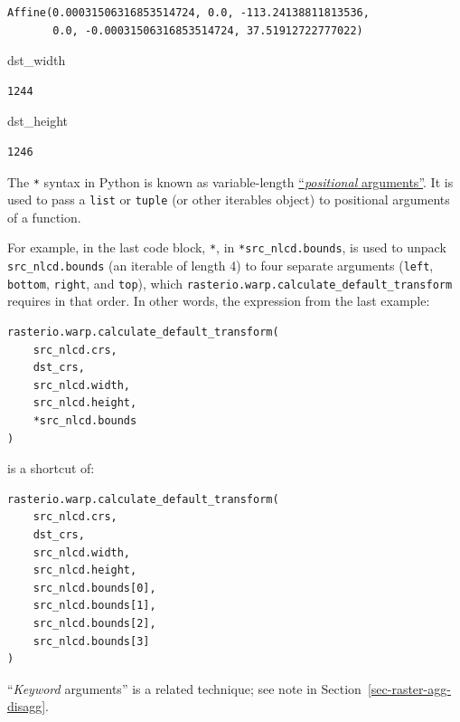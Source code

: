 \documentclass[
  letterpaper,
]{krantz}
\newenvironment{Shaded}{\begin{snugshade}}{\end{snugshade}}
\newcommand{\NormalTok}[1]{\textcolor[rgb]{0.00,0.23,0.31}{#1}}
\begin{document}
\begin{verbatim}
Affine(0.00031506316853514724, 0.0, -113.24138811813536,
       0.0, -0.00031506316853514724, 37.51912722777022)
\end{verbatim}

\begin{Shaded}
\begin{Highlighting}[]
\NormalTok{dst\_width}
\end{Highlighting}
\end{Shaded}

\begin{verbatim}
1244
\end{verbatim}

\begin{Shaded}
\begin{Highlighting}[]
\NormalTok{dst\_height}
\end{Highlighting}
\end{Shaded}

\begin{verbatim}
1246
\end{verbatim}

\begin{tcolorbox}[enhanced jigsaw, title=\textcolor{quarto-callout-note-color}{\faInfo}\hspace{0.5em}{Note}, coltitle=black, colbacktitle=quarto-callout-note-color!10!white, breakable, titlerule=0mm, colframe=quarto-callout-note-color-frame, opacitybacktitle=0.6, colback=white, bottomrule=.15mm, left=2mm, leftrule=.75mm, toprule=.15mm, toptitle=1mm, bottomtitle=1mm, arc=.35mm, opacityback=0, rightrule=.15mm]

The \texttt{*} syntax in Python is known as variable-length
\href{https://docs.python.org/3/glossary.html\#term-argument}{``\emph{positional}
arguments''}. It is used to pass a \texttt{list} or \texttt{tuple} (or
other iterables object) to positional arguments of a function.

For example, in the last code block, \texttt{*}, in
\texttt{*src\_nlcd.bounds}, is used to unpack \texttt{src\_nlcd.bounds}
(an iterable of length 4) to four separate arguments (\texttt{left},
\texttt{bottom}, \texttt{right}, and \texttt{top}), which
\texttt{rasterio.warp.calculate\_default\_transform} requires in that
order. In other words, the expression from the last example:

\begin{verbatim}
rasterio.warp.calculate_default_transform(
    src_nlcd.crs,
    dst_crs,
    src_nlcd.width,
    src_nlcd.height,
    *src_nlcd.bounds
)
\end{verbatim}

is a shortcut of:

\begin{verbatim}
rasterio.warp.calculate_default_transform(
    src_nlcd.crs,
    dst_crs,
    src_nlcd.width,
    src_nlcd.height,
    src_nlcd.bounds[0],
    src_nlcd.bounds[1],
    src_nlcd.bounds[2],
    src_nlcd.bounds[3]
)
\end{verbatim}

``\emph{Keyword} arguments'' is a related technique; see note in
Section~\ref{sec-raster-agg-disagg}.

\end{tcolorbox}
\end{document}
